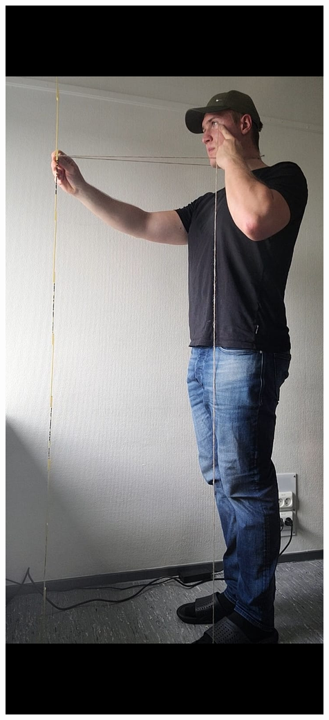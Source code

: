 \documentclass[11pt,a4paper]{article}
\begin{document}
\begin{multicols}{2}
    \includegraphics[width=\linewidth]{measure1.jpg}
    

\end{multicols}
\end{document}
